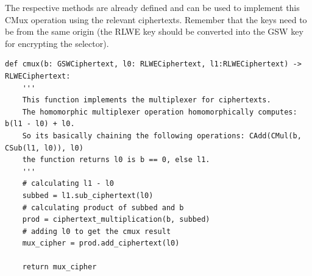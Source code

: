 \documentclass{report}
\begin{document}
The respective methods are already defined and can be used to implement this CMux operation using the relevant ciphertexts. Remember that the keys need to be from the same origin (the RLWE key should be converted into the GSW key for encrypting the selector).

\begin{verbatim}
def cmux(b: GSWCiphertext, l0: RLWECiphertext, l1:RLWECiphertext) -> RLWECiphertext:
	'''
	This function implements the multiplexer for ciphertexts.
	The homomorphic multiplexer operation homomorphically computes: b(l1 - l0) + l0.
	So its basically chaining the following operations: CAdd(CMul(b, CSub(l1, l0)), l0)
	the function returns l0 is b == 0, else l1.
	'''
	# calculating l1 - l0
	subbed = l1.sub_ciphertext(l0)
	# calculating product of subbed and b
	prod = ciphertext_multiplication(b, subbed)
	# adding l0 to get the cmux result
	mux_cipher = prod.add_ciphertext(l0)
	
	return mux_cipher
\end{verbatim}
\end{document}
